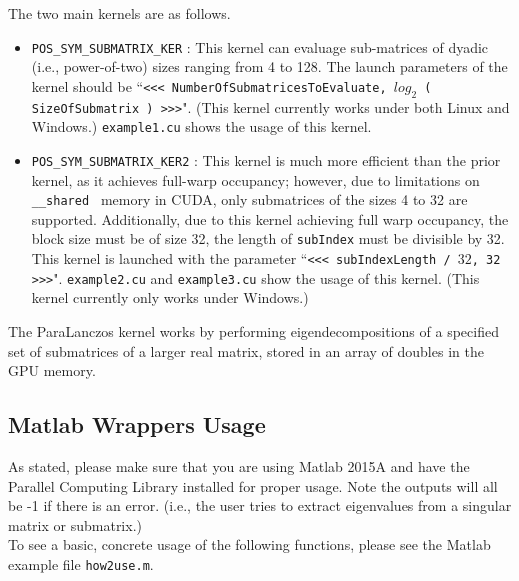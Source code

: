 \documentclass{amsart}
\begin{document}
The two main kernels are as follows.

\begin{itemize}
\item {\tt POS\_SYM\_SUBMATRIX\_KER} :  This kernel can evaluage sub-matrices of dyadic (i.e., power-of-two) sizes ranging from 4 to 128.  The launch parameters of the kernel should be ``{\tt <<< NumberOfSubmatricesToEvaluate, $log_{2} $ ( SizeOfSubmatrix ) >>>}".  (This kernel currently works under both Linux and Windows.)  {\tt example1.cu} shows the usage of this kernel.
\item {\tt POS\_SYM\_SUBMATRIX\_KER2} : This kernel is much more efficient than the prior kernel, as it achieves full-warp occupancy;  however, due to limitations on {\tt \_\_shared } memory in CUDA, only submatrices of the sizes 4 to 32 are supported.  Additionally, due to this kernel achieving full warp occupancy, the block size must be of size 32, the length of {\tt subIndex} must be divisible by 32.  This kernel is launched with the parameter ``{\tt <<< subIndexLength / $ 32$, 32 >>>}".  {\tt example2.cu} and {\tt example3.cu} show the usage of this kernel.  (This kernel currently only works under Windows.)
\end{itemize}

The ParaLanczos kernel works by performing eigendecompositions of a specified set of submatrices of a larger real matrix, stored in an array of doubles in the GPU memory.\\




\subsection{Matlab Wrappers Usage}

As stated, please make sure that you are using Matlab 2015A and have the Parallel Computing Library installed for proper usage.  Note the outputs will all be -1 if there is an error. (i.e., the user tries to extract eigenvalues from a singular matrix or submatrix.)\\

To see a basic, concrete usage of the following functions, please see the Matlab example file {\tt how2use.m}.
\end{document}
